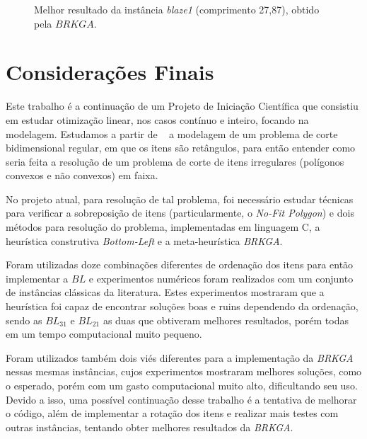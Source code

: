 \documentclass[12pt, openright, twoside, a4paper, english, brazilian]{USPSC-classe/USPSC}
\newcommand{\corC}{LimeGreen}
\newcommand{\corD}{Mahogany}
\newcommand{\corE}{OrangeRed}
\begin{document}
\begin{figure}[H]
\begin{center}
    \caption{Melhor resultado da instância {\it blaze1} (comprimento 27,87), obtido pela $BRKGA$.}
    \label{fig:f20}
    \end{center}
\end{figure}




\section{Considerações Finais} \label{sec:cons_finais}

Este trabalho é a continuação de um Projeto de Iniciação Científica que consistiu em estudar otimização linear, nos casos contínuo e inteiro, focando na modelagem. Estudamos a partir de ~\cite{arenales} a modelagem de um problema de corte bidimensional regular, em que os itens são retângulos, para então entender como seria feita a resolução de um problema de corte de itens irregulares (polígonos convexos e não convexos) em faixa. 

No projeto atual, para resolução de tal problema, foi necessário estudar técnicas para verificar a sobreposição de itens (particularmente, o {\it No-Fit Polygon}) e dois métodos para resolução do problema, implementadas em linguagem C, a heurística construtiva {\it Bottom-Left} e a meta-heurística {\it BRKGA}. 

Foram utilizadas doze combinações diferentes de ordenação dos itens para então implementar a $BL$ e experimentos numéricos foram realizados com um conjunto de instâncias clássicas da literatura. Estes experimentos mostraram que a heurística foi capaz de encontrar soluções boas e ruins dependendo da ordenação, sendo as $BL_{31}$ e $BL_{21}$ as duas que obtiveram melhores resultados, porém todas em um tempo computacional muito pequeno. 

Foram utilizados também dois viés diferentes para a implementação da {\it BRKGA} nessas mesmas instâncias, cujos experimentos mostraram melhores soluções, como o esperado, porém com um gasto computacional muito alto, dificultando seu uso. Devido a isso, uma possível continuação desse trabalho é a tentativa de melhorar o código, além de implementar a rotação dos itens e realizar mais testes com outras instâncias, tentando obter melhores resultados da {\it BRKGA}.


\end{document}
